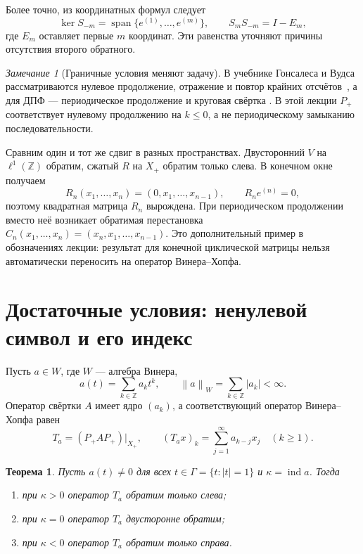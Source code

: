 \documentclass[12pt,a4paper]{article}
\newtheorem{theorem}{Теорема}
\theoremstyle{definition}
\theoremstyle{remark}
\newtheorem*{remark}{Замечание}
\newcommand{\ZZ}{\mathbb{Z}}
\newcommand{\norm}[1]{\left\lVert #1\right\rVert}
\DeclareMathOperator{\ind}{ind}
\begin{document}
Более точно, из координатных формул следует
\[
  \ker S_{-m}=\operatorname{span}\{e^{(1)},\ldots,e^{(m)}\},\qquad
  S_mS_{-m}=I-E_m,
\]
где $E_m$ оставляет первые $m$ координат. Эти равенства уточняют
причины отсутствия второго обратного.

\begin{remark}[Граничные условия меняют задачу]
В учебнике Гонсалеса и Вудса рассматриваются нулевое продолжение,
отражение и повтор крайних отсчётов~\cite[\S\,3.4.2, с.~190]{GW2012},
а для ДПФ --- периодическое продолжение и круговая свёртка
\cite[\S\,4.4.1, с.~269--271]{GW2012}.
В этой лекции $P_+$ соответствует нулевому продолжению
на $k\leqslant0$, а не периодическому замыканию последовательности.

Сравним один и тот же сдвиг в разных пространствах.
Двусторонний $V$ на $\ell^1(\ZZ)$ обратим, сжатый $R$ на $X_+$
обратим только слева. В конечном окне получаем
\[
  R_n(x_1,\ldots,x_n)=(0,x_1,\ldots,x_{n-1}),\qquad R_ne^{(n)}=0,
\]
поэтому квадратная матрица $R_n$ вырождена.
При периодическом продолжении вместо неё возникает обратимая перестановка
$C_n(x_1,\ldots,x_n)=(x_n,x_1,\ldots,x_{n-1})$.
Это дополнительный пример в обозначениях лекции: результат
для конечной циклической матрицы нельзя автоматически переносить
на оператор Винера--Хопфа.
\end{remark}

\section{Достаточные условия: ненулевой символ и его индекс}

Пусть $a\in W$, где $W$ --- алгебра Винера,
\[
  a(t)=\sum_{k\in\ZZ}a_kt^k,\qquad
  \norm{a}_W=\sum_{k\in\ZZ}|a_k|<\infty.
\]
Оператор свёртки $A$ имеет ядро $(a_k)$, а соответствующий оператор
Винера--Хопфа равен
\[
  T_a=(P_+AP_+)\big|_{X_+},\qquad
  (T_ax)_k=\sum_{j=1}^{\infty}a_{k-j}x_j\quad(k\geqslant1).
\]

\begin{theorem}
Пусть $a(t)\ne0$ для всех $t\in\Gamma=\{t:|t|=1\}$ и
$\kappa=\ind a$. Тогда
\begin{enumerate}
  \item при $\kappa>0$ оператор $T_a$ обратим только слева;
  \item при $\kappa=0$ оператор $T_a$ двусторонне обратим;
  \item при $\kappa<0$ оператор $T_a$ обратим только справа.
\end{enumerate}
\end{theorem}
\end{document}
